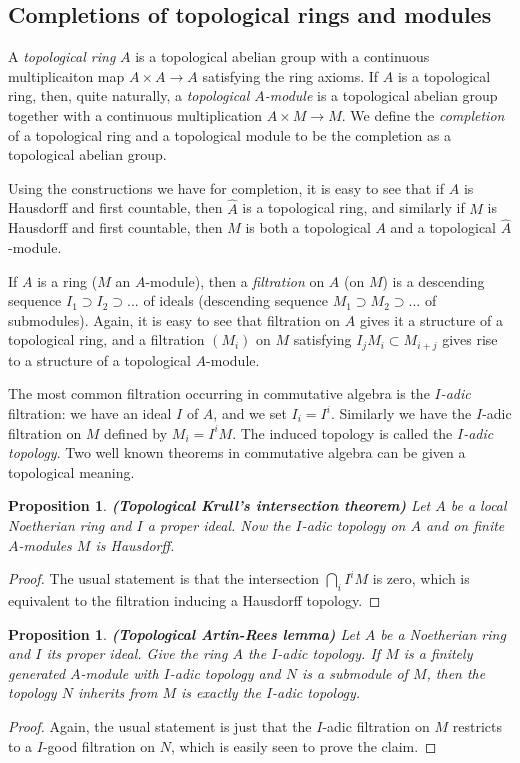 \documentclass[12pt,a4paper,leqno]{article}
\theoremstyle{plain}
\newtheorem{prop}[theo]{Proposition}
\theoremstyle{definition}
\theoremstyle{remark}
\begin{document}
\subsection{Completions of topological rings and modules}

A \emph{topological ring} $A$ is a topological abelian group with a continuous multiplicaiton map $A \times A \to A$ satisfying the ring axioms. If $A$ is a topological ring, then, quite naturally, a \emph{topological $A$-module} is a topological abelian group together with a continuous multiplication $A \times M \to M$. We define the \emph{completion} of a topological ring and a topological module to be the completion as a topological abelian group.

Using the constructions we have for completion, it is easy to see that if $A$ is Hausdorff and first countable, then $\widehat A$ is a topological ring, and similarly if $M$ is Hausdorff and first countable, then $\widehat M$ is both a topological $A$ and a topological $\widehat A$-module.

If $A$ is a ring ($M$ an $A$-module), then a \emph{filtration} on $A$ (on $M$) is a descending sequence $I_1 \supset I_2 \supset ...$ of ideals (descending sequence $M_1 \supset M_2 \supset ...$ of submodules). Again, it is easy to see that filtration on $A$ gives it a structure of a topological ring, and a filtration $(M_i)$ on $M$ satisfying $I_j M_i \subset M_{i+j}$ gives rise to a structure of a topological $A$-module. 

The most common filtration occurring in commutative algebra is the \emph{$I$-adic} filtration: we have an ideal $I$ of $A$, and we set $I_i = I^i$. Similarly we have the $I$-adic filtration on $M$ defined by $M_i = I^i M$. The induced topology is called the \emph{$I$-adic topology}. Two well known theorems in commutative algebra can be given a topological meaning.

\begin{prop}
\textbf{(Topological Krull's intersection theorem)} Let $A$ be a local Noetherian ring and $I$ a proper ideal. Now the $I$-adic topology on $A$ and on finite $A$-modules $M$ is Hausdorff.
\end{prop}
\begin{proof}
The usual statement is that the intersection $\bigcap_i I^iM$ is zero, which is equivalent to the filtration inducing a Hausdorff topology.
\end{proof}

\begin{prop}
\textbf{(Topological Artin-Rees lemma)} Let $A$ be a Noetherian ring and $I$ its proper ideal. Give the ring $A$ the $I$-adic topology. If $M$ is a finitely generated $A$-module with $I$-adic topology and $N$ is a submodule of $M$, then the topology $N$ inherits from $M$ is exactly the $I$-adic topology. 
\end{prop}
\begin{proof}
Again, the usual statement is just that the $I$-adic filtration on $M$ restricts to a $I$-good filtration on $N$, which is easily seen to prove the claim.
\end{proof}
\end{document}
